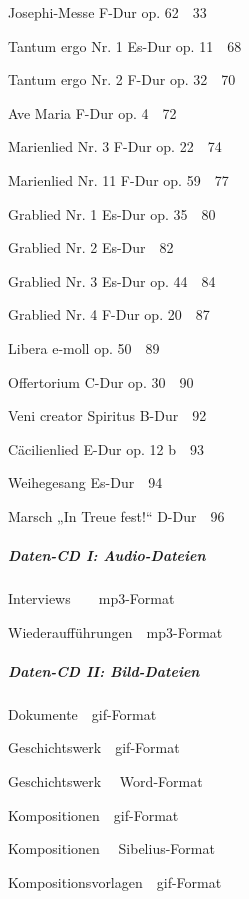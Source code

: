 \documentclass[a4paper]{article}
\begin{document}
{\textquotedbl}Josephi{\textquotedbl}-Messe F-Dur op. 62\ \ 33

Tantum ergo Nr. 1 Es-Dur op. 11\ \ 68

Tantum ergo Nr. 2 F-Dur op. 32\ \ 70

Ave Maria F-Dur op. 4\ \ 72

Marienlied Nr. 3 F-Dur op. 22\ \ 74

Marienlied Nr. 11 F-Dur op. 59\ \ 77

Grablied Nr. 1 Es-Dur op. 35\ \ 80

Grablied Nr. 2 Es-Dur\ \ 82

Grablied Nr. 3 Es-Dur op. 44\ \ 84

Grablied Nr. 4 F-Dur op. 20\ \ 87

Libera e-moll op. 50\ \ 89

Offertorium C-Dur op. 30\ \ 90

Veni creator Spiritus B-Dur\ \ 92

Cäcilienlied E-Dur op. 12 b\ \ 93

Weihegesang Es-Dur\ \ 94

Marsch „In Treue fest!“ D-Dur\ \ 96

\subparagraph[Daten{}-CD I: Audio{}-Dateien]{Daten-CD I: Audio-Dateien}
Interviews\ \ \ \ mp3-Format

Wiederaufführungen\ \ mp3-Format

\subparagraph{Daten-CD II: Bild-Dateien}
Dokumente\ \ gif-Format

Geschichtswerk\ \ gif-Format

Geschichtswerk \ \ Word-Format

Kompositionen\ \ gif-Format

Kompositionen \ \ Sibelius-Format

Kompositionsvorlagen\ \ gif-Format
\end{document}
